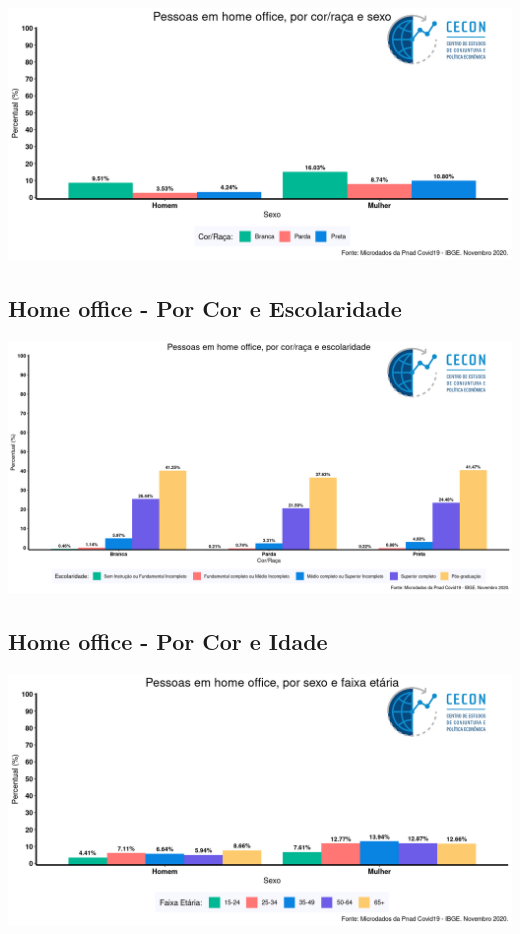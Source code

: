 \documentclass{SelfArx}
\begin{document}
\begin{center}
\includegraphics[width=.9\linewidth]{./figs/PNAD_COVID/home_sexo_cor.png}
\end{center}

\subsection*{Home office - Por Cor e Escolaridade}
\label{sec:org36076fd}
\begin{center}
\includegraphics[width=.9\linewidth]{./figs/PNAD_COVID/home_edu_cor.png}
\end{center}
\subsection*{Home office - Por Cor e Idade}
\label{sec:org29da3a2}
\begin{center}
\includegraphics[width=.9\linewidth]{./figs/PNAD_COVID/home_sexo_idade.png}
\end{center}
\end{document}
